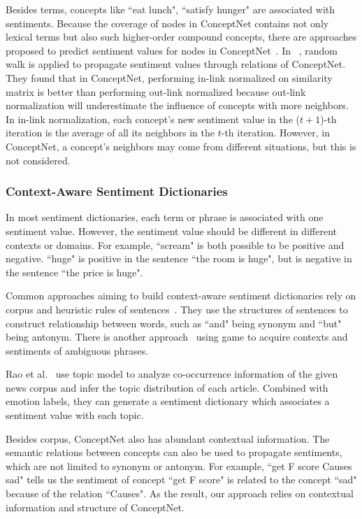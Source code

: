 Besides terms, concepts like ``eat lunch", ``satisfy hunger" are associated with sentiments. Because the coverage of nodes in ConceptNet contains not only lexical terms but also such higher-order compound concepts, there are approaches proposed to predict sentiment values for nodes in ConceptNet~\cite{Liu:IUI03, Cambria:AAAI10, Wu:TAAI11, Tsai:IEEE13, Wu:relSelect14}. In ~\cite{Tsai:IEEE13, Wu:relSelect14}, random walk is applied to propagate sentiment values through relations of ConceptNet. They found that in ConceptNet, performing in-link normalized on similarity matrix is better than performing out-link normalized because out-link normalization will underestimate the influence of concepts with more neighbors. In in-link normalization, each concept's new sentiment value in the ($t+1$)-th iteration is the average of all its neighbors in the $t$-th iteration. However, in ConceptNet, a concept's neighbors may come from different situations, but this is not considered.

\subsubsection{Context-Aware Sentiment Dictionaries}
In most sentiment dictionaries, each term or phrase is associated with one sentiment value. However, the sentiment value should be different in different contexts or domains. For example, ``scream" is both possible to be positive and negative. ``huge" is positive in the sentence ``the room is huge", but is negative in the sentence ``the price is huge".

Common approaches aiming to build context-aware sentiment dictionaries rely on corpus and heuristic rules of sentences~\cite{Xu:PACLIC10, Xu:COLING10, Lu:WWW11}. They use the structures of sentences to construct relationship between words, such as ``and" being synonym and ``but" being antonym. There is another approach~\cite{Boia:AAAI14} using game to acquire contexts and sentiments of ambiguous phrases. 

Rao et al.~\cite{Rao:WWW14} use topic model to analyze co-occurrence information of the given news corpus and infer the topic distribution of each article. Combined with emotion labels, they can generate a sentiment dictionary which associates a sentiment value with each topic. 

Besides corpus, ConceptNet also has abundant contextual information. The semantic relations between concepts can also be used to propagate sentiments, which are not limited to synonym or antonym. For example, ``get F score Causes sad" tells us the sentiment of concept ``get F score" is related to the concept ``sad" because of the relation ``Causes". As the result, our approach relies on contextual information and structure of ConceptNet.